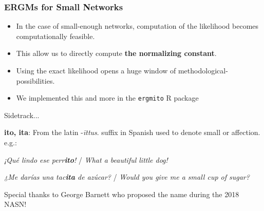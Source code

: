 \documentclass[aspectratio=169, 9pt]{beamer}\usepackage[]{graphicx}\usepackage[]{color}
\newcommand{\ergmitopkg}[0]{\texttt{ergmito}}
\begin{document}
\begin{frame}[label=ergmito]
\frametitle{ERGMs for Small Networks}


\begin{itemize}[<+->]

\item In the case of small-enough networks, computation of the likelihood becomes
computationally feasible.

\item This allow us to directly compute {\bf\color{normconst} the normalizing constant}.\pause

\item Using the exact likelihood opens a huge window of methodological-possibilities.

\item We implemented this and more in the \ergmitopkg{} R package \hyperlink{ergmitopkg}{}
\end{itemize}


\end{frame}



\begin{frame}
Sidetrack...\vspace{.5cm}

\begin{minipage}[c]{1\linewidth}
\large \textbf{ito, ita}: From the latin -\textit{\=ittus}. suffix in Spanish used to denote small or affection. e.g.:

\hspace{.5cm} \textit{¡Qué lindo ese perr\textcolor{USCCardinal}{\textbf{ito}}!} / \textit{What a beautiful little dog!}

\hspace{.5cm} \textit{¿Me darías una tac\textcolor{USCCardinal}{\textbf{ita}} de azúcar?} / \textit{Would you give me a small cup of sugar?}
\normalsize
\end{minipage}\pause

\vfill

\alert{Special thanks to George Barnett who proposed the name during the 2018 NASN!}

\end{frame}
\end{document}
